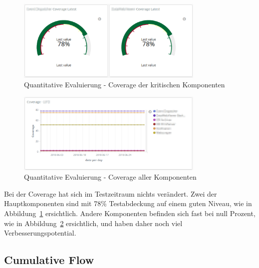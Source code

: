 \begin{savenotes}
    \begin{figure}[H]
      \centering
      \includegraphics[width=0.8\textwidth]{img/eval-coverage-1.png}
      \caption{Quantitative Evaluierung {-} Coverage der kritischen Komponenten}\label{fig:eval_coverage_1}
    \end{figure}
\end{savenotes}

\begin{savenotes}
    \begin{figure}[H]
      \centering
      \includegraphics[width=0.8\textwidth]{img/eval-coverage-2.png}
      \caption{Quantitative Evaluierung {-} Coverage aller Komponenten}\label{fig:eval_coverage_2}
    \end{figure}
\end{savenotes}

Bei der Coverage hat sich im Testzeitraum nichts verändert.
Zwei der Hauptkomponenten sind mit 78\% Testabdeckung auf einem guten Niveau, wie in Abbildung~\ref{fig:eval_coverage_1} ersichtlich.
Andere Komponenten befinden sich fast bei null Prozent, wie in Abbildung~\ref{fig:eval_coverage_2} ersichtlich, und haben daher noch viel Verbesserungspotential.

\clearpage
\subsection*{Cumulative Flow}

